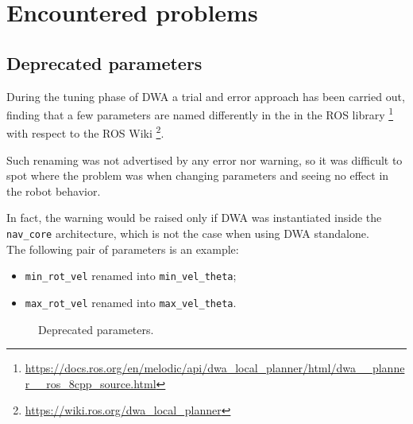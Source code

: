 \documentclass[11pt,a4paper]{article}
\begin{document}
\section{Encountered problems}



\subsection{Deprecated parameters}

During the tuning phase of DWA a trial and error approach has been carried out, finding that
a few parameters are named differently in the in the ROS library
\footnote{\href{https://docs.ros.org/en/melodic/api/dwa\_local\_planner/html/dwa\_\_planner\_\_ros\_8cpp\_source.html}{https://docs.ros.org/en/melodic/api/dwa\_local\_planner/html/dwa\_\_planner\_\_ros\_8cpp\_source.html}}
with respect to the ROS Wiki
\footnote{\href{https://wiki.ros.org/dwa\_local\_planner}{https://wiki.ros.org/dwa\_local\_planner}}.

Such renaming was not advertised by any error nor warning, so it was difficult to spot where the problem
was when changing parameters and seeing no effect in the robot behavior.

In fact, the warning would be raised only if DWA was instantiated inside the \texttt{nav\_core} architecture,
which is not the case when using DWA standalone.\\

The following pair of parameters is an example:
\begin{itemize}
 \item \texttt{min\_rot\_vel} renamed into \texttt{min\_vel\_theta};
 \item \texttt{max\_rot\_vel} renamed into \texttt{max\_vel\_theta}.\\
\end{itemize}

\begin{figure}[H]
    \centering
    \quad
    \caption[]{Deprecated parameters.}
\end{figure}
\end{document}
